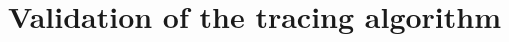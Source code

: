 \documentclass[12pt,english,twocolumn]{revtex4}
\begin{document}




\section{Validation of the tracing algorithm}
\end{document}
